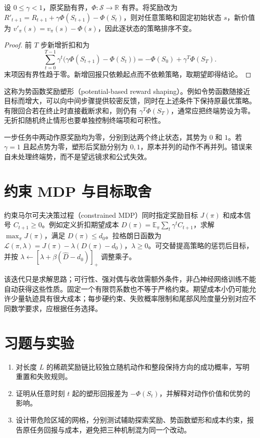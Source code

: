 \begin{theorem}[折扣任务中的势函数塑形]
设 $0\leq\gamma<1$，原奖励有界，$\Phi:\mathcal S\to\mathbb R$ 有界。将奖励改为 $R'_{t+1}=R_{t+1}+\gamma\Phi(S_{t+1})-\Phi(S_t)$，则对任意策略和固定初始状态 $s$，新价值为 $v'_\pi(s)=v_\pi(s)-\Phi(s)$，因此逐状态的策略排序不变。
\end{theorem}
\begin{proof}
前 $T$ 步新增折扣和为
\[
\sum_{t=0}^{T-1}\gamma^t\bigl(\gamma\Phi(S_{t+1})-\Phi(S_t)\bigr)
=-\Phi(S_0)+\gamma^T\Phi(S_T).
\]
末项因有界性趋于零。新增回报只依赖起点而不依赖策略，取期望即得结论。
\end{proof}

这称为势函数奖励塑形（potential-based reward shaping）。例如令势函数随接近目标而增大，可以向中间步骤提供较密反馈，同时在上述条件下保持原最优策略。有限回合若在终止时直接截断求和，则仍有 $\gamma^T\Phi(S_T)$，通常应把终端势设为零。无折扣随机终止情形也要单独控制终端项和可积性。

\begin{example}[忽略边界会改变最优动作]
一步任务中两动作原奖励均为零，分别到达两个终止状态，其势为 $0$ 和 $1$。若 $\gamma=1$ 且起点势为零，塑形后奖励分别为 $0,1$，原本并列的动作不再并列。错误来自未处理终端势，而不是望远镜求和公式失效。
\end{example}

\section{约束 MDP 与目标取舍}

约束马尔可夫决策过程（constrained MDP）同时指定奖励目标 $J(\pi)$ 和成本信号 $C_{t+1}\geq0$。例如定义折扣期望成本 $D(\pi)=\mathbb E_\pi\sum_t\gamma^tC_{t+1}$，求解 $\max_\pi J(\pi)$，满足 $D(\pi)\leq d_0$。拉格朗日函数为 $\mathcal L(\pi,\lambda)=J(\pi)-\lambda(D(\pi)-d_0)$，$\lambda\geq0$。可交替提高策略的惩罚后目标，并按 $\lambda\leftarrow[\lambda+\beta(\widehat D-d_0)]_+$ 调整乘子。

该迭代只是求解思路；可行性、强对偶与收敛需额外条件，非凸神经网络训练不能自动获得这些性质。固定一个有限罚系数也不等于严格约束。期望成本小仍可能允许少量轨迹具有很大成本；每步硬约束、失败概率限制和尾部风险度量分别对应不同数学要求，应根据任务选择。

\section{习题与实验}
\begin{enumerate}
\item 对长度 $L$ 的稀疏奖励链比较独立随机动作和整段保持方向的成功概率，写明重置和失败规则。
\item 证明从任意时刻 $t$ 起的塑形回报差为 $-\Phi(S_t)$，并解释对动作价值和优势的影响。
\item 设计带危险区域的网格，分别测试辅助探索奖励、势函数塑形和成本约束，报告原任务回报与成本，避免把三种机制混为同一个改动。
\end{enumerate}





